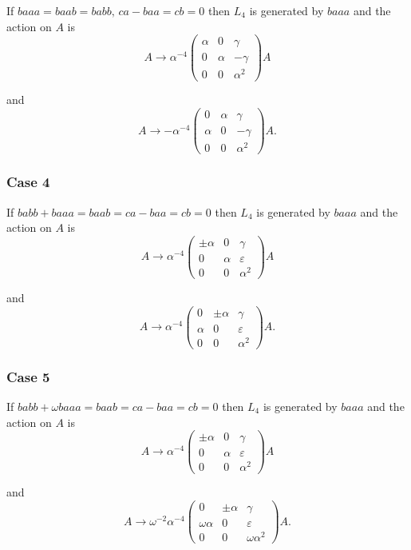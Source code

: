 \documentclass[10pt]{article}
\begin{document}
If $baaa=baab=babb,\,ca-baa=cb=0$ then $L_{4}$ is generated by $baaa$ and
the action on $A$ is 
\[
A\rightarrow \alpha ^{-4}\left( 
\begin{array}{lll}
\alpha & 0 & \gamma \\ 
0 & \alpha & -\gamma \\ 
0 & 0 & \alpha ^{2}%
\end{array}%
\right) A 
\]

and 
\[
A\rightarrow -\alpha ^{-4}\left( 
\begin{array}{lll}
0 & \alpha & \gamma \\ 
\alpha & 0 & -\gamma \\ 
0 & 0 & \alpha ^{2}%
\end{array}%
\right) A. 
\]

\subsubsection{Case 4}

If $babb+baaa=baab=ca-baa=cb=0$ then $L_{4}$ is generated by $baaa$ and the
action on $A$ is 
\[
A\rightarrow \alpha ^{-4}\left( 
\begin{array}{lll}
\pm \alpha & 0 & \gamma \\ 
0 & \alpha & \varepsilon \\ 
0 & 0 & \alpha ^{2}%
\end{array}%
\right) A 
\]

and 
\[
A\rightarrow \alpha ^{-4}\left( 
\begin{array}{lll}
0 & \pm \alpha & \gamma \\ 
\alpha & 0 & \varepsilon \\ 
0 & 0 & \alpha ^{2}%
\end{array}%
\right) A. 
\]

\subsubsection{Case 5}

If $babb+\omega baaa=baab=ca-baa=cb=0$ then $L_{4}$ is generated by $baaa$
and the action on $A$ is 
\[
A\rightarrow \alpha ^{-4}\left( 
\begin{array}{lll}
\pm \alpha & 0 & \gamma \\ 
0 & \alpha & \varepsilon \\ 
0 & 0 & \alpha ^{2}%
\end{array}%
\right) A 
\]

and 
\[
A\rightarrow \omega ^{-2}\alpha ^{-4}\left( 
\begin{array}{lll}
0 & \pm \alpha & \gamma \\ 
\omega \alpha & 0 & \varepsilon \\ 
0 & 0 & \omega \alpha ^{2}%
\end{array}%
\right) A. 
\]
\end{document}
